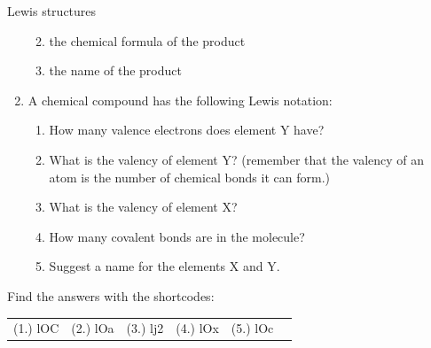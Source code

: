 \begin{exercises}{Lewis structures}
\begin{enumerate}[noitemsep, label=\textbf{\arabic*}. ]
\begin{enumerate}[noitemsep, label=\textbf{\alph*}. ]
\label{m38701*uid36}\item the chemical formula of the product
\label{m38701*uid37}\item the name of the product
\end{enumerate}
                \label{m38701*uid38}\item A chemical compound has the following Lewis notation:
    \setcounter{subfigure}{0}
	\begin{figure}[H] %
\begin{center}
\end{center}
 \end{figure}       \label{m38701*id141181}\begin{enumerate}[noitemsep, label=\textbf{\alph*}. ] 
            \label{m38701*uid39}\item How many valence electrons does element $\text{Y}$ have?
\label{m38701*uid40}\item What is the valency of element $\text{Y}$? (remember that the valency of an atom is the number of chemical bonds it can form.)
\label{m38701*uid41}\item What is the valency of element $\text{X}$?
\label{m38701*uid42}\item How many covalent bonds are in the molecule?
\label{m38701*uid43}\item Suggest a name for the elements $\text{X}$ and $\text{Y}$.
\end{enumerate}
                \end{enumerate}
  \label{m38701**end}
\practiceinfo
\par {} Find the answers with the shortcodes:
 \par \begin{tabular}[h]{cccccc}
 (1.) lOC  &  (2.) lOa  &  (3.) lj2  &  (4.) lOx  &  (5.) lOc  & \end{tabular}
\end{exercises}
    \label{m38704*cid5}
